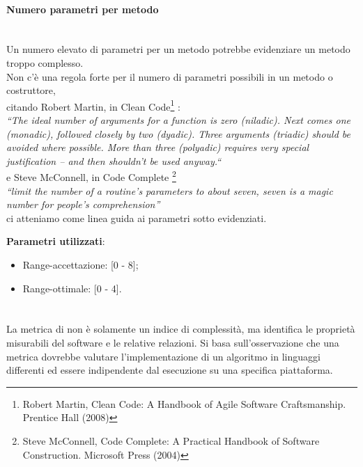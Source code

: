 			\paragraph{Numero parametri per metodo}\mbox{} \\
			Un numero elevato di parametri per un metodo potrebbe evidenziare un metodo troppo complesso.\\
			Non c'è una regola forte per il numero di parametri possibili in un metodo o costruttore, \\
			citando Robert Martin, in Clean Code\footnote{Robert Martin, Clean Code: A Handbook of Agile Software Craftsmanship. 	
			Prentice Hall (2008)} : \\ 
			\emph{“The ideal number of arguments for a function is zero (niladic). Next 
			comes 
			one (monadic), followed closely by two (dyadic). Three arguments (triadic) should be avoided where possible. More than 
			three (polyadic) requires very special justification – and then shouldn’t be used anyway.“} \\ 
			e Steve McConnell, in Code Complete \footnote{Steve McConnell, Code Complete: A Practical Handbook of Software
			Construction. Microsoft Press (2004)} \\
			 \emph{“limit the number of a routine’s parameters to about seven, seven is a magic number for people’s comprehension”}  
			\\
			ci atteniamo come linea guida ai parametri sotto evidenziati.
			
			\textbf{Parametri utilizzati}:
			\begin{itemize}
				\item Range-accettazione: [0 - 8];
				\item Range-ottimale: [0 - 4].
			\end{itemize}

			
			\paragraph{}\mbox{} \\
			
			La metrica di  non è solamente un indice di complessità, ma identifica le proprietà misurabili del software e le relative relazioni. Si basa sull'osservazione che una metrica dovrebbe valutare l'implementazione di un algoritmo in linguaggi differenti ed essere indipendente dal esecuzione su una specifica piattaforma.

